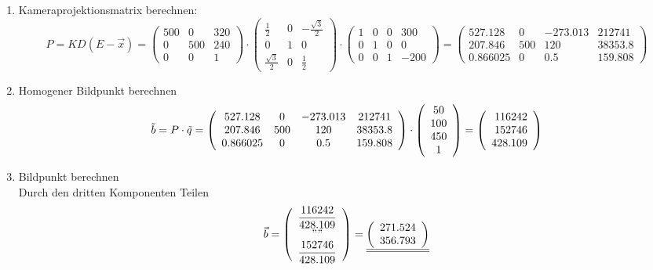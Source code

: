\begin{enumerate}
	\item Kameraprojektionsmatrix berechnen:\\
		\begin{equation*}
			P = KD(E-\vec{x}) = 
			\left(\begin{array}{ccc} 
			500 & 0 & 320\\
			0 & 500 & 240\\
			0 & 0 & 1 
			\end{array}\right)
			\cdot
			\left(\begin{array}{ccc} 
			\frac 1 2 & 0 & -\frac{\sqrt{3}}{2}\\
			0 & 1 & 0\\
			\frac{\sqrt{3}}{2} & 0 & \frac{1}{2} 
			\end{array}\right)
			\cdot
			\left(\begin{array}{cccc} 
			1 & 0 & 0 & 300\\
			0 & 1 & 0 & 0\\
			0 & 0 & 1 & -200
			\end{array}\right)
			=
			\left(\begin{array}{cccc} 
			527.128 & 0 & -273.013 & 212741\\
			207.846 & 500 & 120 & 38353.8\\
			0.866025 & 0 & 0.5 & 159.808
			\end{array}\right)			
		\end{equation*}
		
	\item Homogener Bildpunkt berechnen
	\begin{equation*}
		\tilde{b} = P \cdot \tilde{q}
		=
		\left(\begin{array}{cccc} 
		527.128 & 0 & -273.013 & 212741\\
		207.846 & 500 & 120 & 38353.8\\
		0.866025 & 0 & 0.5 & 159.808
		\end{array}\right)
		\cdot
		\left(\begin{array}{c}
		50\\100\\450\\1
		\end{array}\right)
		=
		\left(\begin{array}{r} 116242 \\ 152746 \\ 428.109 \\ \end{array}\right)
	\end{equation*}
	
	\item Bildpunkt berechnen\\
	Durch den dritten Komponenten Teilen\\
	\begin{equation*}
		\vec{b}
		=
		\left(\begin{array}{c}
			\displaystyle \frac{116242}{428.109}\\
			" "\\
			 \displaystyle \frac{152746}{428.109}
		\end{array}\right)
		= 
		\underline{\underline{
				\left(\begin{array}{c}
				271.524\\
				356.793
				\end{array}\right)}}
	\end{equation*}
\end{enumerate}
\clearpage
